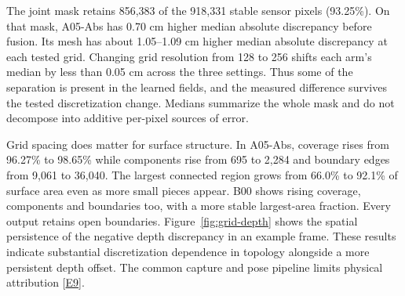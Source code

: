 The joint mask retains 856,383 of the 918,331 stable sensor pixels (93.25\%). On that mask, A05-Abs has 0.70 cm higher median absolute discrepancy before fusion. Its mesh has about 1.05--1.09 cm higher median absolute discrepancy at each tested grid. Changing grid resolution from 128 to 256 shifts each arm's median by less than 0.05 cm across the three settings. Thus some of the separation is present in the learned fields, and the measured difference survives the tested discretization change. Medians summarize the whole mask and do not decompose into additive per-pixel sources of error.

Grid spacing does matter for surface structure. In A05-Abs, coverage rises from 96.27\% to 98.65\% while components rise from 695 to 2,284 and boundary edges from 9,061 to 36,040. The largest connected region grows from 66.0\% to 92.1\% of surface area even as more small pieces appear. B00 shows rising coverage, components and boundaries too, with a more stable largest-area fraction. Every output retains open boundaries. Figure~\ref{fig:grid-depth} shows the spatial persistence of the negative depth discrepancy in an example frame. These results indicate substantial discretization dependence in topology alongside a more persistent depth offset. The common capture and pose pipeline limits physical attribution [\hyperlink{evE9}{E9}].
